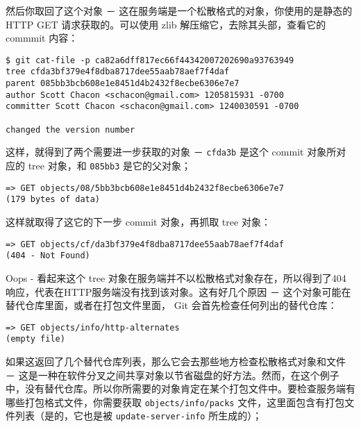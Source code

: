 \documentclass[a4paper]{book}
\begin{document}
然后你取回了这个对象 － 这在服务端是一个松散格式的对象，你使用的是静态的 HTTP GET 请求获取的。可以使用 zlib 解压缩它，去除其头部，查看它的 commmit 内容：

\begin{shaded}\begin{verbatim}
$ git cat-file -p ca82a6dff817ec66f44342007202690a93763949
tree cfda3bf379e4f8dba8717dee55aab78aef7f4daf
parent 085bb3bcb608e1e8451d4b2432f8ecbe6306e7e7
author Scott Chacon <schacon@gmail.com> 1205815931 -0700
committer Scott Chacon <schacon@gmail.com> 1240030591 -0700

changed the version number
\end{verbatim}\end{shaded}

这样，就得到了两个需要进一步获取的对象 － \texttt{cfda3b} 是这个 commit 对象所对应的 tree 对象，和 \texttt{085bb3} 是它的父对象；

\begin{shaded}\begin{verbatim}
=> GET objects/08/5bb3bcb608e1e8451d4b2432f8ecbe6306e7e7
(179 bytes of data)
\end{verbatim}\end{shaded}

这样就取得了这它的下一步 commit 对象，再抓取 tree 对象：

\begin{shaded}\begin{verbatim}
=> GET objects/cf/da3bf379e4f8dba8717dee55aab78aef7f4daf
(404 - Not Found)
\end{verbatim}\end{shaded}

Oops - 看起来这个 tree 对象在服务端并不以松散格式对象存在，所以得到了404响应，代表在HTTP服务端没有找到该对象。这有好几个原因 － 这个对象可能在替代仓库里面，或者在打包文件里面， Git 会首先检查任何列出的替代仓库：

\begin{shaded}\begin{verbatim}
=> GET objects/info/http-alternates
(empty file)
\end{verbatim}\end{shaded}

如果这返回了几个替代仓库列表，那么它会去那些地方检查松散格式对象和文件 － 这是一种在软件分叉之间共享对象以节省磁盘的好方法。然而，在这个例子中，没有替代仓库。所以你所需要的对象肯定在某个打包文件中。要检查服务端有哪些打包格式文件，你需要获取 \texttt{objects/info/packs} 文件，这里面包含有打包文件列表（是的，它也是被 \texttt{update-server-info} 所生成的）；
\end{document}
